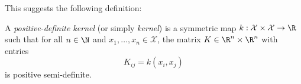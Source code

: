 \documentclass[a4paper]{article}
\begin{document}
%
%
%
%
%

This suggests the following definition:
\begin{defi}
  A \emph{positive-definite kernel} (or simply \emph{kernel}) is a symmetric map $k: \mathcal{X} \times \mathcal{X} \to \R$ such that for all $n \in \N$ and $x_1, \ldots, x_n \in \mathcal{X}$, the matrix $K \in \R^n \times \R^n$ with entries
  \[
    K_{ij} = k(x_i, x_j)
  \]
  is positive semi-definite.
\end{defi}

%
%
%
\end{document}
